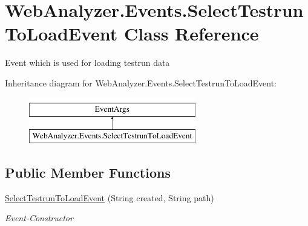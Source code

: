 \hypertarget{class_web_analyzer_1_1_events_1_1_select_testrun_to_load_event}{}\section{Web\+Analyzer.\+Events.\+Select\+Testrun\+To\+Load\+Event Class Reference}
\label{class_web_analyzer_1_1_events_1_1_select_testrun_to_load_event}


Event which is used for loading testrun data  


Inheritance diagram for Web\+Analyzer.\+Events.\+Select\+Testrun\+To\+Load\+Event\+:\begin{figure}[H]
\begin{center}
\leavevmode
\includegraphics[height=2.000000cm]{class_web_analyzer_1_1_events_1_1_select_testrun_to_load_event}
\end{center}
\end{figure}
\subsection*{Public Member Functions}
\begin{DoxyCompactItemize}
\item 
\hyperlink{class_web_analyzer_1_1_events_1_1_select_testrun_to_load_event_a501c6eaae7adedfd08087018fe6e4e7c}{Select\+Testrun\+To\+Load\+Event} (String created, String path)
\begin{DoxyCompactList}\small\item\em Event-\/\+Constructor \end{DoxyCompactList}\end{DoxyCompactItemize}
